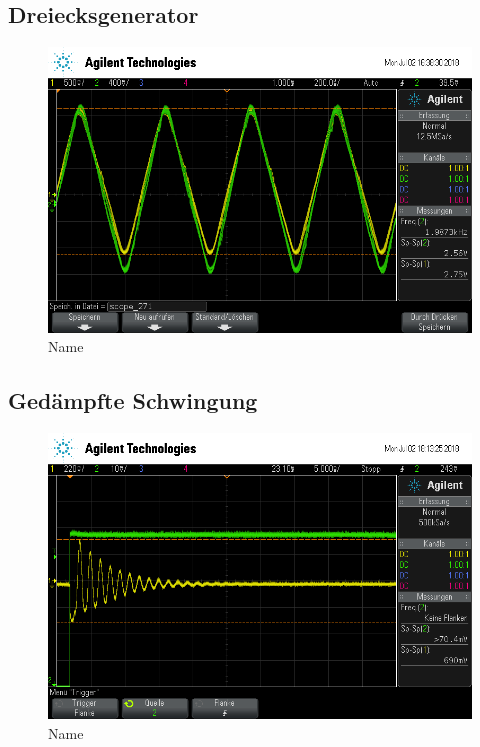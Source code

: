 \subsection{Dreiecksgenerator}
\begin{figure}[ht]
  \centering
  \includegraphics[height=0.3\textheight]{data/scope_271.png}
  \caption{Name}
  \label{fig:dreieck_generator}
\end{figure}

\subsection{Ged\"ampfte Schwingung}
\begin{figure}[ht]
  \centering
  \includegraphics[height=0.3\textheight]{data/scope_275.png}
  \caption{Name}
  \label{fig:gedaempft}
\end{figure}
